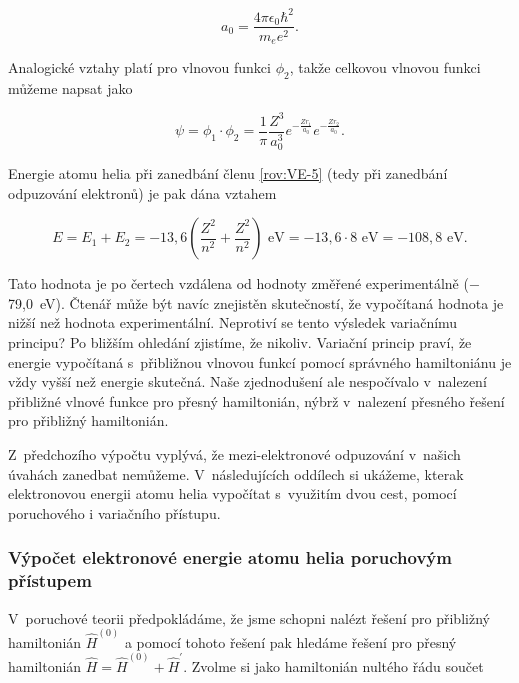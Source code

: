 \begin{equation}
a_0 = \frac{4 \pi \epsilon_0 \hbar^2}{m_e e^2}.
\label{rov:VE-9}
\end{equation}

\noindent Analogické vztahy platí pro vlnovou funkci $\phi_2$, takže celkovou vlnovou funkci můžeme napsat jako 

\begin{equation}
\psi = \phi_1 \cdot \phi_2 = \frac{1}{\pi} \frac{Z^3}{a_0^3} e^{-\frac{Z r_1}{a_0}} e^{-\frac{Z r_2}{a_0}}.
\label{rov:VE-10}
\end{equation}


\noindent Energie atomu helia při zanedbání členu \eqref{rov:VE-5} (tedy při zanedbání odpuzování elektronů) je pak dána vztahem

\begin{equation}
E = E_1 + E_2 = -13{,}6 \left(\frac{Z^2}{n^2} + \frac{Z^2}{n^2} \right) \mbox{ eV} = -13{,}6 \cdot 8 \mbox{ eV} = -108{,}8 \mbox{ eV}.
\label{rov:VE-11}
\end{equation}

Tato hodnota je po čertech vzdálena od hodnoty změřené experimentálně ($-$79,0~eV). Čtenář může být navíc znejistěn skutečností, že vypočítaná hodnota je nižší než hodnota experimentální. Neprotiví se tento výsledek variačnímu principu? Po bližším ohledání zjistíme, že nikoliv. Variační princip praví, že energie vypočítaná s~přibližnou vlnovou funkcí pomocí správného hamiltoniánu je vždy vyšší než energie skutečná. Naše zjednodušení ale nespočívalo v~nalezení přibližné vlnové funkce pro přesný hamiltonián, nýbrž v~nalezení přesného řešení pro přibližný hamiltonián. 

Z~předchozího výpočtu vyplývá, že mezi-elektronové odpuzování v~našich úvahách zanedbat nemůžeme. V~následujících oddílech si ukážeme, kterak elektronovou energii atomu helia vypočítat s~využitím dvou cest, pomocí poruchového i variačního přístupu.

\subsubsection{Výpočet elektronové energie atomu helia poruchovým přístupem}

V~poruchové teorii předpokládáme, že jsme schopni nalézt řešení pro přibližný hamiltonián $\hat{H}^{(0)}$ a pomocí tohoto řešení pak hledáme řešení pro přesný hamiltonián $\hat{H} = \hat{H}^{(0)} + \hat{H}^{\prime}$. Zvolme si jako hamiltonián nultého řádu součet

